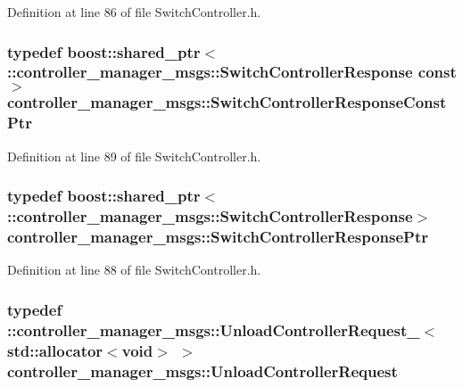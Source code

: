 \-Definition at line 86 of file \-Switch\-Controller.\-h.

\subsubsection[{\-Switch\-Controller\-Response\-Const\-Ptr}]{\setlength{\rightskip}{0pt plus 5cm}typedef boost\-::shared\-\_\-ptr$<$ \-::{\bf controller\-\_\-manager\-\_\-msgs\-::\-Switch\-Controller\-Response} const$>$ {\bf controller\-\_\-manager\-\_\-msgs\-::\-Switch\-Controller\-Response\-Const\-Ptr}}\label{namespacecontroller__manager__msgs_af173119881152f89672e08ef6c911e45}


\-Definition at line 89 of file \-Switch\-Controller.\-h.

\subsubsection[{\-Switch\-Controller\-Response\-Ptr}]{\setlength{\rightskip}{0pt plus 5cm}typedef boost\-::shared\-\_\-ptr$<$ \-::{\bf controller\-\_\-manager\-\_\-msgs\-::\-Switch\-Controller\-Response}$>$ {\bf controller\-\_\-manager\-\_\-msgs\-::\-Switch\-Controller\-Response\-Ptr}}\label{namespacecontroller__manager__msgs_a664a854b9aba28ab4770aba091d5e439}


\-Definition at line 88 of file \-Switch\-Controller.\-h.

\subsubsection[{\-Unload\-Controller\-Request}]{\setlength{\rightskip}{0pt plus 5cm}typedef \-::{\bf controller\-\_\-manager\-\_\-msgs\-::\-Unload\-Controller\-Request\-\_\-}$<$std\-::allocator$<$void$>$ $>$ {\bf controller\-\_\-manager\-\_\-msgs\-::\-Unload\-Controller\-Request}}\label{namespacecontroller__manager__msgs_ad7e2817f930bbc36e1602efdd9ccdab4}


